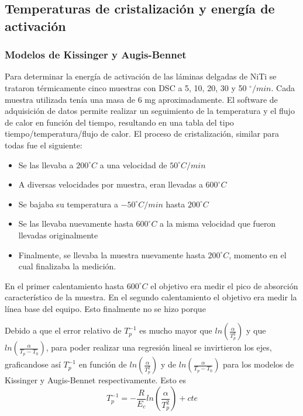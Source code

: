 \documentclass{article}
\theoremstyle{definition}
\theoremstyle{remark}
\begin{document}
\subsection{Temperaturas de cristalización y energía de activación}
\subsubsection{Modelos de Kissinger y Augis-Bennet}
Para determinar la energía de activación de las láminas delgadas de NiTi se trataron térmicamente cinco muestras con DSC a 5, 10, 20, 30 y 50 $^{\circ}/min$. Cada muestra utilizada tenía una masa de 6 mg aproximadamente. El software de adquisición de datos permite realizar un seguimiento de la temperatura y el flujo de calor en función del tiempo, resultando en una tabla del tipo tiempo/temperatura/flujo de calor. El proceso de cristalización, similar para todas fue el siguiente:

\begin{itemize}
\item Se las llevaba a $200^{\circ}C$ a una velocidad de $50^{\circ}C/min$
\item A diversas velocidades por muestra, eran llevadas a $600^{\circ}C$
\item Se bajaba su temperatura a $-50^{\circ}C/min$ hasta $200^{\circ}C$
\item Se las llevaba nuevamente hasta $600^{\circ}C$ a la misma velocidad que fueron llevadas originalmente
\item Finalmente, se llevaba la muestra nuevamente hasta $200^{\circ}C$, momento en el cual finalizaba la medición.
\end{itemize}
En el primer calentamiento hasta $600^{\circ}C$ el objetivo era medir el pico de absorción característico de la muestra. En el segundo calentamiento el objetivo era medir la línea base del equipo. Esto finalmente no se hizo porque

Debido a que el error relativo de $T_p^{-1}$ es mucho mayor que $ln(\frac{\alpha}{T_p^2})$ y que $ln(\frac{\alpha}{T_p-T_0})$, para poder realizar una regresión lineal se invirtieron los ejes, graficandose así $T_p^{-1}$ en función de $ln(\frac{\alpha}{T_p^2})$ y de $ln(\frac{\alpha}{T_p-T_0})$ para los modelos de Kissinger y Augis-Bennet respectivamente. Esto es
\begin{equation}
	T_p^{-1}=-\frac{R}{E_c}ln(\frac{\alpha}{T_p^2})+cte
\end{equation}
\end{document}
